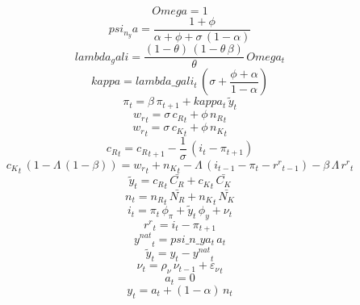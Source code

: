 \documentclass[10pt,a4paper]{article}
\begin{document}
\footnotesize
\begin{dmath*}
Omega = 1
\end{dmath*}
\begin{dmath*}
psi_n_ya = \frac{1+{\phi}}{{\alpha}+{\phi}+{\sigma}\, \left(1-{\alpha}\right)}
\end{dmath*}
\begin{dmath*}
lambda_gali = \frac{\left(1-{\theta}\right)\, \left(1-{\theta}\, {\beta}\right)}{{\theta}}\, Omega_{t}
\end{dmath*}
\begin{dmath*}
kappa = lambda\_gali_{t}\, \left({\sigma}+\frac{{\phi}+{\alpha}}{1-{\alpha}}\right)
\end{dmath*}
\begin{dmath}
{\pi}_{t}={\beta}\, {\pi}_{t+1}+kappa_{t}\, {\tilde y}_{t}
\end{dmath}
\begin{dmath}
{w_r}_{t}={\sigma}\, {c_R}_{t}+{\phi}\, {n_R}_{t}
\end{dmath}
\begin{dmath}
{w_r}_{t}={\sigma}\, {c_K}_{t}+{\phi}\, {n_K}_{t}
\end{dmath}
\begin{dmath}
{c_R}_{t}={c_R}_{t+1}-\frac{1}{{\sigma}}\, \left({i}_{t}-{\pi}_{t+1}\right)
\end{dmath}
\begin{dmath}
{c_K}_{t}\, \left(1-{\Lambda}\, \left(1-{\beta}\right)\right)={w_r}_{t}+{n_K}_{t}-{\Lambda}\, \left({i}_{t-1}-{\pi}_{t}-{r^r}_{t-1}\right)-{\beta}\, {\Lambda}\, {r^r}_{t}
\end{dmath}
\begin{dmath}
{\tilde y}_{t}={c_R}_{t}\, \bar{C_R}+{c_K}_{t}\, \bar{C_K}
\end{dmath}
\begin{dmath}
{n}_{t}={n_R}_{t}\, \bar{N_R}+{n_K}_{t}\, \bar{N_K}
\end{dmath}
\begin{dmath}
{i}_{t}={\pi}_{t}\, {\phi_{\pi}}+{\tilde y}_{t}\, {\phi_{y}}+{\nu}_{t}
\end{dmath}
\begin{dmath}
{r^r}_{t}={i}_{t}-{\pi}_{t+1}
\end{dmath}
\begin{dmath}
{y^{nat}}_{t}=psi\_n\_ya_{t}\, {a}_{t}
\end{dmath}
\begin{dmath}
{\tilde y}_{t}={y}_{t}-{y^{nat}}_{t}
\end{dmath}
\begin{dmath}
{\nu}_{t}={\rho_{\nu}}\, {\nu}_{t-1}+{\varepsilon_\nu}_{t}
\end{dmath}
\begin{dmath}
{a}_{t}=0
\end{dmath}
\begin{dmath}
{y}_{t}={a}_{t}+\left(1-{\alpha}\right)\, {n}_{t}
\end{dmath}
\end{document}
